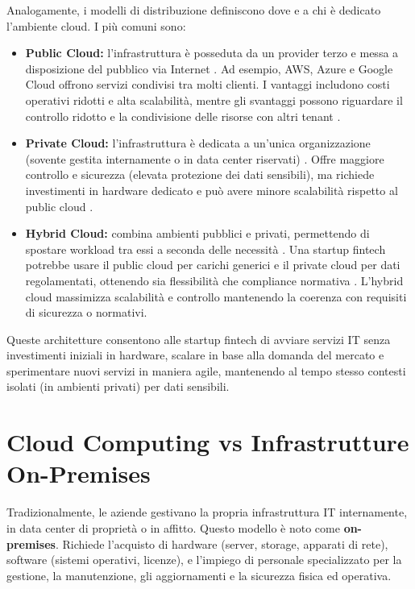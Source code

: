 \documentclass[a4paper,12pt]{report}
\begin{document}
Analogamente, i modelli di distribuzione definiscono dove e a chi è dedicato l’ambiente cloud. I più comuni sono:
\begin{itemize}
    \item \textbf{Public Cloud:} l’infrastruttura è posseduta da un provider terzo e messa a disposizione del pubblico via Internet \cite{geeksforgeeks_scalability}. Ad esempio, AWS, Azure e Google Cloud offrono servizi condivisi tra molti clienti. I vantaggi includono costi operativi ridotti e alta scalabilità, mentre gli svantaggi possono riguardare il controllo ridotto e la condivisione delle risorse con altri tenant \cite{geeksforgeeks_scalability}.
    \item \textbf{Private Cloud:} l’infrastruttura è dedicata a un’unica organizzazione (sovente gestita internamente o in data center riservati) \cite{geeksforgeeks_scalability}. Offre maggiore controllo e sicurezza (elevata protezione dei dati sensibili), ma richiede investimenti in hardware dedicato e può avere minore scalabilità rispetto al public cloud \cite{geeksforgeeks_scalability}.
    \item \textbf{Hybrid Cloud:} combina ambienti pubblici e privati, permettendo di spostare workload tra essi a seconda delle necessità \cite{geeksforgeeks_scalability}. Una startup fintech potrebbe usare il public cloud per carichi generici e il private cloud per dati regolamentati, ottenendo sia flessibilità che compliance normativa \cite{geeksforgeeks_scalability}. L’hybrid cloud massimizza scalabilità e controllo mantenendo la coerenza con requisiti di sicurezza o normativi.
\end{itemize}
Queste architetture consentono alle startup fintech di avviare servizi IT senza investimenti iniziali in hardware, scalare in base alla domanda del mercato e sperimentare nuovi servizi in maniera agile, mantenendo al tempo stesso contesti isolati (in ambienti privati) per dati sensibili.
\section{Cloud Computing vs Infrastrutture On-Premises}
\label{sec:cloud-vs-onprem}

Tradizionalmente, le aziende gestivano la propria infrastruttura IT internamente, in data center di proprietà o in affitto. Questo modello è noto come \textbf{on-premises}. Richiede l'acquisto di hardware (server, storage, apparati di rete), software (sistemi operativi, licenze), e l'impiego di personale specializzato per la gestione, la manutenzione, gli aggiornamenti e la sicurezza fisica ed operativa.
\end{document}
